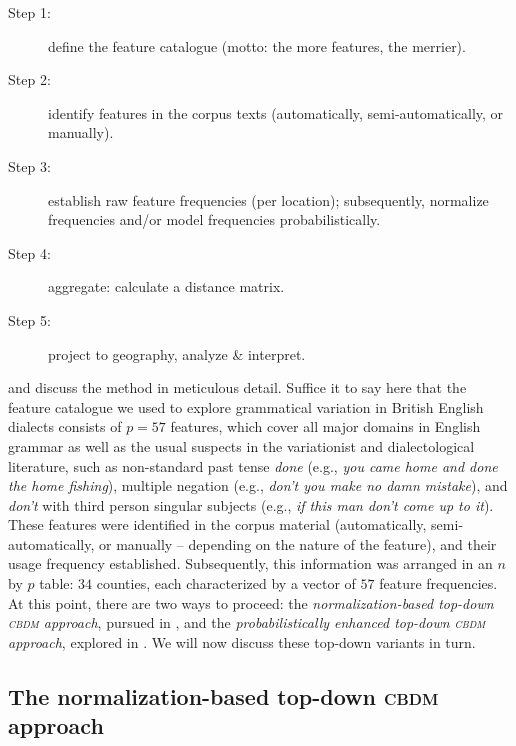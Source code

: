\documentclass[output=paper]{LSP/langsci}
\begin{document}
  \begin{description}

    \item[Step 1:] define the feature catalogue (motto: the more features, the merrier).

    \item[Step 2:] identify features in the corpus texts (automatically, semi-automatically, or manually).

    \item[Step 3:] establish raw feature frequencies (per location); subsequently, normalize frequencies and/or model frequencies probabilistically.

    \item[Step 4:] aggregate: calculate a distance matrix.

    \item[Step 5:] project to geography, analyze \& interpret.

  \end{description}

\citet{szmrecsanyi_grammatical_2013} and \citet{wolk_integrating_2014} discuss the method in meticulous detail.
Suffice it to say here that the feature catalogue we used to explore grammatical variation in British English dialects consists of $p = 57$ features, which cover all major domains in English grammar as well as the usual suspects in the variationist and dialectological literature, such as non-standard past tense \textit{done} (e.g., \textit{you came home and done the home fishing}), multiple negation (e.g., \textit{don't you make no damn mistake}), and \textit{don't} with third person singular subjects (e.g., \textit{if this man don't come up to it}).
These features were identified in the corpus material (automatically, semi-automatically, or manually -- depending on the nature of the feature), and their usage frequency established.
Subsequently, this information was arranged in an $n$ by $p$ table: $34$ counties, each characterized by a vector of $57$ feature frequencies. At this point, there are two ways to proceed: the \emph{normalization-based top-down \textsc{cbdm} approach}, pursued in \citet{szmrecsanyi_grammatical_2013}, and the \emph{probabilistically enhanced top-down \textsc{cbdm} approach}, explored in \citet{wolk_integrating_2014}.
We will now discuss these top-down variants in turn.


\subsection{The normalization-based top-down \textsc{cbdm} approach}\label{topdownnormalized}
\end{document}
